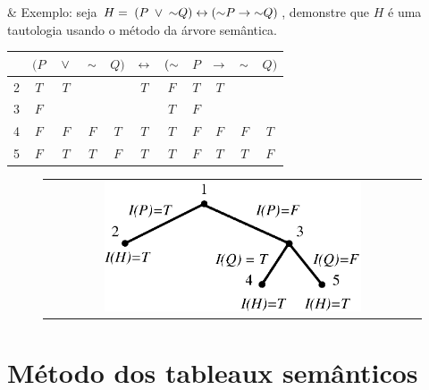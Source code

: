 \clearpage

\begin{easylist}
  & Exemplo: seja $H = \; (P \;\lor\; \mathord{\sim} Q) \leftrightarrow (\mathord{\sim} P \rightarrow \mathord{\sim} Q)$, demonstre que $H$ é uma tautologia usando o método da árvore semântica.
\end{easylist}

\begin{center}
  \begin{tabular}{ c|cccccccccc }
        & $(P$ & $\;\lor\;$ & $\mathord{\sim}$ & $Q)$ & $\leftrightarrow$ & $(\mathord{\sim}$ & $P$ & $\rightarrow$ & $\mathord{\sim}$ & $Q)$ \\
    \hline
      2 & $T$  & $T$   &        &      & $T$    & $F$     & $T$ & $T$    &        &      \\
    \hline
      3 & $F$  &       &        &      &        & $T$     & $F$ &        &        &      \\
    \hline
      4 & $F$  & $F$   & $F$    & $T$  & $T$    & $T$     & $F$ & $F$    & $F$    & $T$  \\
    \hline
      5 & $F$  & $T$   & $T$    & $F$  & $T$    & $T$     & $F$ & $T$    & $T$    & $F$  \\
  \end{tabular}
\end{center}

\begin{figure}[h!]
  \begin{center}
    \begin{tabular}{c}
      \includegraphics[width=0.7\textwidth]{images/04/tree_02.eps}
    \end{tabular}
  \end{center}
\end{figure}


\section{Método dos tableaux semânticos}

